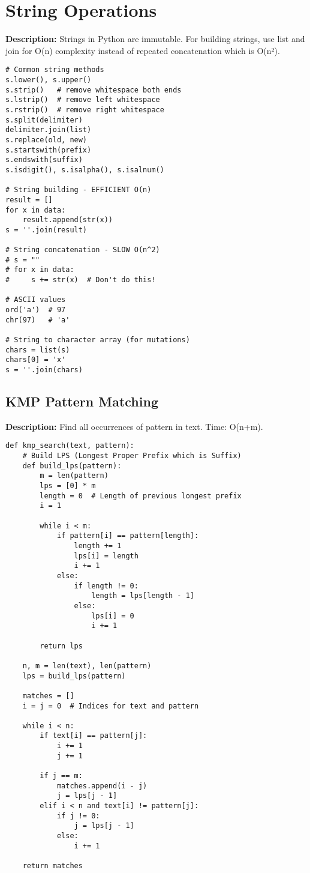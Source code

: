 \section{String Operations}

\textbf{Description:} Strings in Python are immutable. For building strings, use list and join for O(n) complexity instead of repeated concatenation which is O(n²).

\begin{lstlisting}
# Common string methods
s.lower(), s.upper()
s.strip()   # remove whitespace both ends
s.lstrip()  # remove left whitespace
s.rstrip()  # remove right whitespace
s.split(delimiter)
delimiter.join(list)
s.replace(old, new)
s.startswith(prefix)
s.endswith(suffix)
s.isdigit(), s.isalpha(), s.isalnum()

# String building - EFFICIENT O(n)
result = []
for x in data:
    result.append(str(x))
s = ''.join(result)

# String concatenation - SLOW O(n^2)
# s = ""
# for x in data:
#     s += str(x)  # Don't do this!

# ASCII values
ord('a')  # 97
chr(97)   # 'a'

# String to character array (for mutations)
chars = list(s)
chars[0] = 'x'
s = ''.join(chars)
\end{lstlisting}

\subsection{KMP Pattern Matching}
\textbf{Description:} Find all occurrences of pattern in text. Time: O(n+m).

\begin{lstlisting}
def kmp_search(text, pattern):
    # Build LPS (Longest Proper Prefix which is Suffix)
    def build_lps(pattern):
        m = len(pattern)
        lps = [0] * m
        length = 0  # Length of previous longest prefix
        i = 1
        
        while i < m:
            if pattern[i] == pattern[length]:
                length += 1
                lps[i] = length
                i += 1
            else:
                if length != 0:
                    length = lps[length - 1]
                else:
                    lps[i] = 0
                    i += 1
        
        return lps
    
    n, m = len(text), len(pattern)
    lps = build_lps(pattern)
    
    matches = []
    i = j = 0  # Indices for text and pattern
    
    while i < n:
        if text[i] == pattern[j]:
            i += 1
            j += 1
        
        if j == m:
            matches.append(i - j)
            j = lps[j - 1]
        elif i < n and text[i] != pattern[j]:
            if j != 0:
                j = lps[j - 1]
            else:
                i += 1
    
    return matches
\end{lstlisting}

